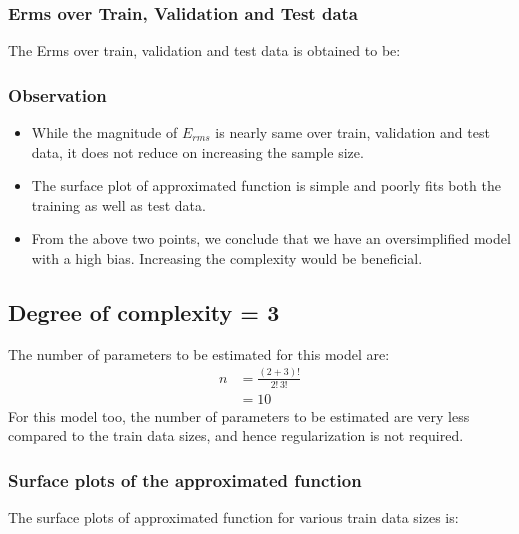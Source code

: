 \documentclass[12pt,a4paper]{article}
\newcommand{\noi}{\noindent}
\begin{document}
\noi

\subsubsection{Erms over Train, Validation and Test data}
The Erms over train, validation and test data is obtained to be: 


\subsubsection{Observation}
\begin{itemize}
    \itemsep0em
    \item While the magnitude of $E_{rms}$ is nearly same over train, validation and test data, it does not reduce on increasing the sample size. 
    \item The surface plot of approximated function is simple and poorly fits both the training as well as test data.
    \item From the above two points, we conclude that we have an oversimplified model with a high bias. Increasing the complexity would be beneficial.
\end{itemize}

\subsection{Degree of complexity = 3}
The number of parameters to be estimated for this model are: 
\begin{equation}
    \begin{split}
        n&=\frac{(2+3)!}{2!\,3!} \\
         &=10
    \end{split}
\end{equation}
\noi
For this model too, the number of parameters to be estimated are very less compared to the train data sizes, and hence regularization is not required. 

\subsubsection{Surface plots of the approximated function}
The surface plots of approximated function for various train data sizes is: 
\end{document}
